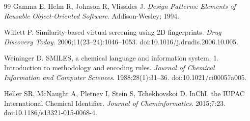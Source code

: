\documentclass[10pt]{article}
\begin{document}
\begin{thebibliography}{99}
Gamma E, Helm R, Johnson R, Vlissides J.
\emph{Design Patterns: Elements of Reusable Object-Oriented Software}.
Addison-Wesley; 1994.

Willett P.
Similarity-based virtual screening using 2D fingerprints.
\emph{Drug Discovery Today}. 2006;11(23--24):1046--1053.
doi:10.1016/j.drudis.2006.10.005.

Weininger D.
SMILES, a chemical language and information system. 1. Introduction to methodology and encoding rules.
\emph{Journal of Chemical Information and Computer Sciences}. 1988;28(1):31--36.
doi:10.1021/ci00057a005.

Heller SR, McNaught A, Pletnev I, Stein S, Tchekhovskoi D.
InChI, the IUPAC International Chemical Identifier.
\emph{Journal of Cheminformatics}. 2015;7:23.
doi:10.1186/s13321-015-0068-4.

\end{thebibliography}
\end{document}
